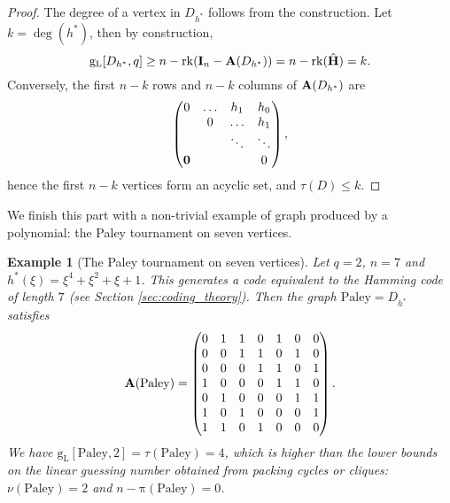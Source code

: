 \documentclass[a4paper, 11pt]{book}
\numberwithin{equation}{section}
\theoremstyle{plain}
\newtheorem{example}	[equation]	{Example}
\newcommand{\feedback}{\tau}
\newcommand{\packing}{\nu}
\newcommand{\cliqueCover}{\mathrm{\pi}}
\newcommand{\adjacency}{{\bf A}}
\newcommand{\linear}[1]{#1_\mathrm{L}}
\newcommand{\guessing}{\mathrm{g}}
\newcommand{\linearGuessing}{\linear{\guessing}}
\newcommand{\rank}{\mathrm{rk}}
\renewcommand{\(}{\ldbrack}
\renewcommand{\)}{\rdbrack}
\begin{document}
\begin{proof}
The degree of a vertex in $D_{h^*}$ follows from the construction. Let $k = \deg(h^*)$, then by construction, 
\[
	\linearGuessing[D_{h^*}, q] \ge n - \rank({\bf I}_n - \adjacency(D_{h^*})) = n - \rank(\hat{\bf H}) = k.
\]
Conversely, the first $n-k$ rows and $n-k$ columns of $\adjacency(D_{h^*})$ are
\[
	\begin{pmatrix}
	0		& \dots	& h_1 		& h_0		\\
			& 0 	& \dots		& h_1	 	\\
			&    	& \ddots 	& \ddots 	\\
	{\bf 0}	& 		& 			& 0		
	\end{pmatrix},
\]
hence the first $n-k$ vertices form an acyclic set, and $\feedback(D) \le k$.
\end{proof}


We finish this part with a non-trivial example of graph produced by a polynomial: the Paley tournament on seven vertices.

\begin{example}[The Paley tournament on seven vertices] \label{ex:Paley}
Let $q=2$, $n=7$ and $h^*(\xi) = \xi^4 + \xi^2 + \xi + 1$. This generates a code equivalent to the Hamming code of length $7$ (see Section \ref{sec:coding_theory}). Then the graph $\mathrm{Paley} = D_{h^*}$ satisfies
\[
	\adjacency(\mathrm{Paley}) = \begin{pmatrix}
		0 & 1 & 1 & 0 & 1 & 0 & 0 \\
		0 & 0 & 1 & 1 & 0 & 1 & 0 \\
		0 & 0 & 0 & 1 & 1 & 0 & 1 \\
		1 & 0 & 0 & 0 & 1 & 1 & 0 \\
		0 & 1 & 0 & 0 & 0 & 1 & 1 \\
		1 & 0 & 1 & 0 & 0 & 0 & 1 \\
		1 & 1 & 0 & 1 & 0 & 0 & 0 
		\end{pmatrix}.
\]
We have $\linearGuessing[\mathrm{Paley}, 2] = \feedback(\mathrm{Paley}) = 4$, which is higher than the lower bounds on the linear guessing number obtained from packing cycles or cliques: $\packing(\mathrm{Paley}) = 2$ and $n - \cliqueCover(\mathrm{Paley}) = 0$. 
\end{example}
\end{document}
